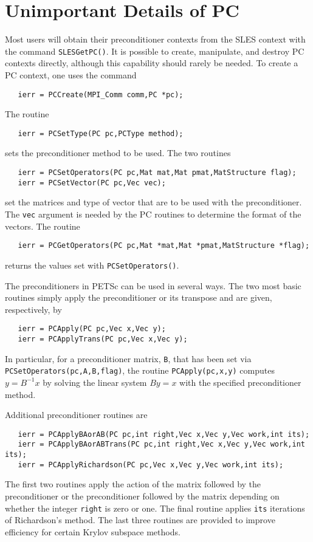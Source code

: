 \section{Unimportant Details of PC}

Most users will obtain their preconditioner contexts from the SLES
context with the command {\tt SLESGetPC()}. It is possible to create,
manipulate, and destroy PC contexts directly, although this capability
should rarely be needed. To create a PC context, one uses the command
\begin{verbatim}
   ierr = PCCreate(MPI_Comm comm,PC *pc);
\end{verbatim}
The routine 
\begin{verbatim}
   ierr = PCSetType(PC pc,PCType method);
\end{verbatim}
sets the preconditioner method to be used. 
The two routines  
\begin{verbatim}
   ierr = PCSetOperators(PC pc,Mat mat,Mat pmat,MatStructure flag);
   ierr = PCSetVector(PC pc,Vec vec);
\end{verbatim}
set the matrices and type of vector that are to be used with 
the preconditioner.  The {\tt vec} argument is needed by the PC routines 
to determine the format of the vectors. 
The routine 
\begin{verbatim}
   ierr = PCGetOperators(PC pc,Mat *mat,Mat *pmat,MatStructure *flag);
\end{verbatim}
returns the values set with {\tt PCSetOperators()}.

  
The preconditioners in PETSc can be used in several ways.  The two
most basic routines simply apply the preconditioner or its transpose
and are given, respectively, by
\begin{verbatim}
   ierr = PCApply(PC pc,Vec x,Vec y);
   ierr = PCApplyTrans(PC pc,Vec x,Vec y);
\end{verbatim}
In particular, for a preconditioner matrix, {\tt B}, that has
been set via {\tt PCSetOperators(pc,A,B,flag)},
the routine {\tt PCApply(pc,x,y)} computes $y = B^{-1} x$
by solving the linear system $By = x$ with the specified preconditioner
method.

 
Additional preconditioner routines are
\begin{verbatim}
   ierr = PCApplyBAorAB(PC pc,int right,Vec x,Vec y,Vec work,int its);
   ierr = PCApplyBAorABTrans(PC pc,int right,Vec x,Vec y,Vec work,int its);
   ierr = PCApplyRichardson(PC pc,Vec x,Vec y,Vec work,int its);
\end{verbatim}
The first two routines apply the action of the matrix followed by the
preconditioner or the preconditioner followed by the matrix depending
on whether the  integer {\tt right} is
zero or one. The final routine applies {\tt its} iterations of
Richardson's method. The last three routines are provided to improve
efficiency for certain Krylov subspace methods.

